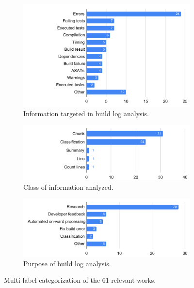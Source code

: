 \documentclass[10pt,journal,compsoc]{IEEEtran}
\begin{document}
\begin{figure}
\centering
\begin{subfigure}[t]{\columnwidth}
		\centering
		\includegraphics[width=\columnwidth,
		clip]{img/lit-sur/info_target.pdf}
		\caption{Information targeted in build log analysis.}
		\label{fig:litsur:info_target}

\end{subfigure}\hspace{\fill}
\begin{subfigure}[t]{\columnwidth}
		\centering
				\includegraphics[width=\columnwidth,
				clip]{img/lit-sur/kind.pdf}
		\caption{Class of information analyzed.}
		\label{fig:litsur:kind}

\end{subfigure}
\begin{subfigure}[t]{\columnwidth}
		\centering
				\includegraphics[width=\columnwidth,
				clip]{img/lit-sur/use.pdf}
		\caption{Purpose of build log analysis.}
		\label{fig:litsur:use}

\end{subfigure}

\caption{Multi-label categorization of the 61 relevant works.}
\label{fig:litsur_r}
\end{figure}
\end{document}
